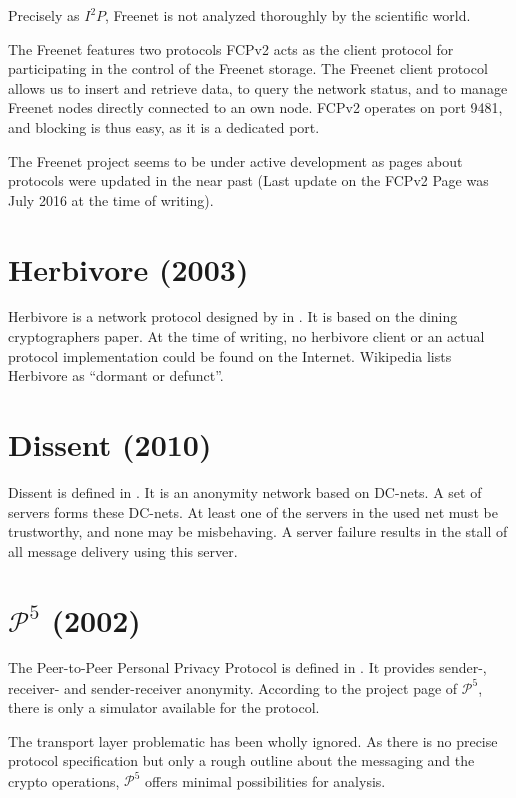Precisely as $I^2P$, Freenet is not analyzed thoroughly by the scientific world. 

The Freenet features two protocols FCPv2 acts as the client protocol for participating in the control of the Freenet storage. The Freenet client protocol allows us to insert and retrieve data, to query the network status, and to manage Freenet nodes directly connected to an own node. FCPv2 operates on port 9481, and blocking is thus easy, as it is a dedicated port. 

The Freenet project seems to be under active development as pages about protocols were updated in the near past (Last update on the FCPv2 Page was July  2016 at the time of writing).

\section{Herbivore (2003)}
Herbivore is a network protocol designed by \citeauthor{herbivore:tr} in \cite{herbivore:tr}. It is based on the dining cryptographers paper\cite{chaum-dc}. At the time of writing, no herbivore client or an actual protocol implementation could be found on the Internet. Wikipedia lists Herbivore as ``dormant or defunct''.

\section{Dissent (2010)}
Dissent is defined in \cite{Corrigan-Gibbs:2010:DAA:1866307.1866346}. It is an anonymity network based on DC-nets. A set of servers forms these DC-nets. At least one of the servers in the used net must be trustworthy, and none may be misbehaving. A server failure results in the stall of all message delivery using this server.

\section{\texorpdfstring{$\mathcal{P}^5$}{P5} (2002)}
The Peer-to-Peer Personal Privacy Protocol is defined in \cite{sherwood-protocol}. It provides sender-, receiver- and sender-receiver anonymity. According to the project page of $\mathcal{P}^5$, there is only a simulator available for the protocol.

The transport layer problematic has been wholly ignored. As there is no precise protocol specification but only a rough outline about the messaging and the crypto operations, $\mathcal{P}^5$ offers minimal possibilities for analysis.

